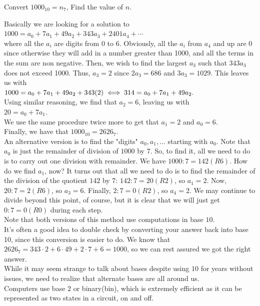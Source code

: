 \begin{example}
    Convert $1000_{10}=n_7$, Find the value of $n$. 
\end{example}
Basically we are looking for a solution to \\
$1000 = a_0 + 7a_1 + 49a_2 + 343a_3+2401a_4+\cdots$\\
where all the $a_i$ are digits from 0 to 6. Obviously, all the $a_i$ from $a_4$ and up are 0 since otherwise they will add in a number greater than 1000, and all the terms in the sum are non negative. Then, we wish to find the largest $a_3$ such that $343a_3$ does not exceed 1000. Thus, $a_3= 2$ since $2a_3=686$ and $3a_3=1029$. This leaves us with\\
$1000 = a_0 + 7a_1 + 49 a_2 + 343(2)\\
\iff 314 = a_0 + 7a_1 + 49 a_2.$\\
Using similar reasoning, we find that $a_2 = 6$, leaving us with\\
$20 = a_0 + 7a_1.$\\
We use the same procedure twice more to get that $a_1=2$ and $a_0=6$.\\
Finally, we have that $1000_{10}=2626_7$.\\
An alternative version is to find the "digits" $a_0,a_1,\dots$ starting with $a_0$. Note that $a_0$ is just the remainder of division of $1000$ by $7$. So, to find it, all we need to do is to carry out one division with remainder. We have $1000:7=142(R6)$. How do we find $a_1$, now? It turns out that all we need to do is to find the remainder of the division of the quotient $142$ by $7$: $142:7=20(R2)$, so $a_1=2$. Now, $20:7=2(R6)$, so $a_3=6$. Finally, $2:7=0(R2)$, so $a_4=2$. We may continue to divide beyond this point, of course, but it is clear that we will just get $0:7=0(R0)$ during each step.\\
Note that both versions of this method use computations in base $10$.\\
It's often a good idea to double check by converting your answer back into base 10, since this conversion is easier to do. We know that $2626_7=343\cdot 2 + 6\cdot 49 + 2\cdot 7 + 6=1000$, so we can rest assured we got the right answer.\\
While it may seem strange to talk about bases despite using $10$ for years without issues, we need to realize that alternate bases are all around us.\\
Computers use base $2$ or binary(bin), which is extremely efficient as it can be represented as two states in a circuit, on and off.\\
